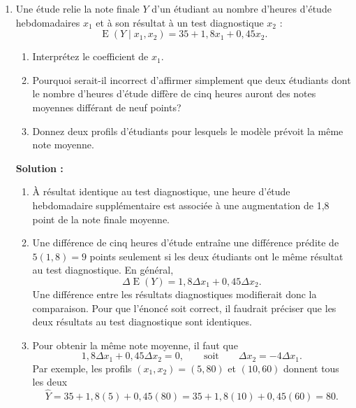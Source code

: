 \documentclass[letter, 11pt]{article}
\newcommand{\E}{\operatorname{E}}
\newcommand{\prof}[1]{\ifdefined\avecsolutions\par{\color{blue}\textbf{Solution :} #1}\par\fi}
\begin{document}
\begin{enumerate}[leftmargin=*, wide, label=\bf Exercice \arabic*:]
{\begin{enumerate}[label=\alph*)]
  \item Pour des valeurs identiques de $x_1$ et $x_3$, une augmentation d'une
        unité de $x_2$ produit
        \[
          \Delta\widehat{Y}=18{,}5
        \]
        milliers de dollars. Le prix prédit de la seconde maison est donc
        supérieur de 18~500~\$.

\end{enumerate}

}



\item 
Une étude relie la note finale $Y$ d'un étudiant au nombre d'heures d'étude
hebdomadaires $x_1$ et à son résultat à un test diagnostique $x_2$ :
\[
  \E(Y\mid x_1,x_2)=35+1{,}8x_1+0{,}45x_2.
\]

\begin{enumerate}[label=\alph*)]
  \item Interprétez le coefficient de $x_1$.
  \item Pourquoi serait-il incorrect d'affirmer simplement que deux étudiants
        dont le nombre d'heures d'étude diffère de cinq heures auront des notes
        moyennes différant de neuf points?
  \item Donnez deux profils d'étudiants pour lesquels le modèle prévoit la
        même note moyenne.
\end{enumerate}

\prof{
\begin{enumerate}[label=\alph*)]
  \item À résultat identique au test diagnostique, une heure d'étude
        hebdomadaire supplémentaire est associée à une augmentation de
        1,8 point de la note finale moyenne.

  \item Une différence de cinq heures d'étude entraîne une différence prédite
        de $5(1{,}8)=9$ points seulement si les deux étudiants ont le même
        résultat au test diagnostique. En général,
        \[
          \Delta\E(Y)=1{,}8\Delta x_1+0{,}45\Delta x_2.
        \]
        Une différence entre les résultats diagnostiques modifierait donc la
        comparaison. Pour que l'énoncé soit correct, il faudrait préciser que les deux résultats au test diagnostique sont identiques.

  \item Pour obtenir la même note moyenne, il faut que
        \[
          1{,}8\Delta x_1+0{,}45\Delta x_2=0,
          \qquad\text{soit}\qquad
          \Delta x_2=-4\Delta x_1.
        \]
        Par exemple, les profils $(x_1,x_2)=(5,80)$ et $(10,60)$ donnent tous
        les deux
        \[
          \widehat{Y}=35+1{,}8(5)+0{,}45(80)
                     =35+1{,}8(10)+0{,}45(60)=80.
        \]
\end{enumerate}
}



\end{enumerate}
\end{document}
